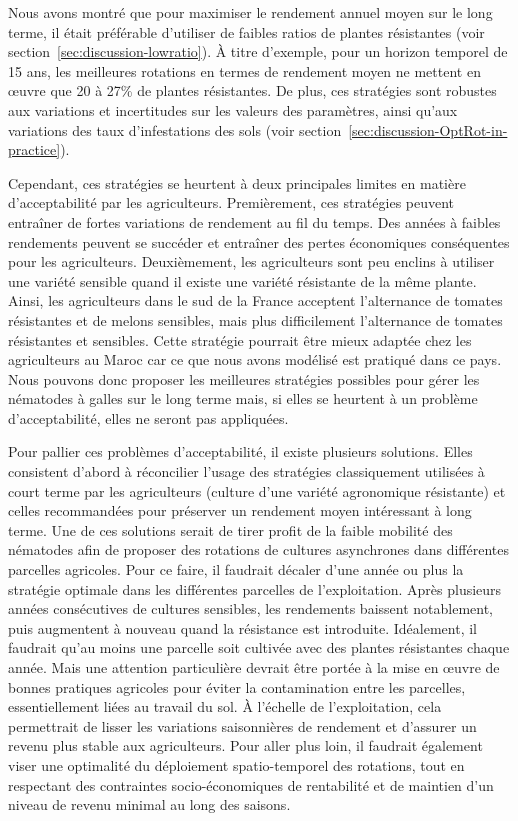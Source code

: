 	Nous avons montré que pour maximiser le rendement annuel moyen sur le long terme,  il était préférable d'utiliser de faibles ratios de plantes résistantes  (voir section~\ref{sec:discussion-lowratio}). À titre d'exemple, pour un horizon temporel de 15 ans, les meilleures rotations en termes de rendement moyen ne mettent en œuvre que 20 à 27\% de plantes résistantes. De plus, ces stratégies sont robustes aux variations et incertitudes sur les valeurs des paramètres, ainsi qu'aux variations des  taux d'infestations des sols (voir section~\ref{sec:discussion-OptRot-in-practice}).
	
	Cependant,  ces stratégies se heurtent à deux principales limites en matière d'acceptabilité par les agriculteurs.  Premièrement, ces stratégies  peuvent  entraîner de fortes variations de rendement au fil du temps. Des années à faibles rendements peuvent se succéder et entraîner des pertes économiques conséquentes pour les agriculteurs. Deuxièmement, les agriculteurs sont peu enclins à utiliser une variété sensible quand il existe une variété résistante de la même plante. Ainsi, les agriculteurs dans le sud de la France acceptent l'alternance de tomates résistantes et de melons sensibles, mais plus difficilement l'alternance de tomates résistantes et sensibles. Cette stratégie pourrait être mieux adaptée chez les agriculteurs au Maroc car ce que nous avons modélisé est pratiqué dans ce pays. 
Nous pouvons donc proposer les meilleures stratégies  possibles pour gérer les nématodes à galles sur le long terme mais,  si elles se heurtent à un problème d'acceptabilité, elles ne seront pas appliquées.
	
	Pour pallier ces problèmes d'acceptabilité, il existe plusieurs solutions. Elles consistent d'abord à réconcilier l'usage des stratégies classiquement  utilisées à court terme par les agriculteurs (culture d'une variété agronomique résistante) et celles recommandées pour préserver un rendement moyen intéressant à long terme. Une de ces solutions serait  de tirer profit de la faible mobilité des nématodes afin de proposer des rotations de cultures  asynchrones dans différentes parcelles agricoles. Pour ce faire, il faudrait décaler d'une année ou plus la stratégie optimale dans les différentes parcelles de l'exploitation. Après plusieurs années consécutives de cultures sensibles, les rendements baissent notablement, puis augmentent à nouveau quand la résistance est introduite. Idéalement, il faudrait qu'au moins une parcelle soit cultivée avec des plantes résistantes chaque année. Mais une attention particulière devrait être portée à la mise en œuvre  de bonnes pratiques agricoles  pour éviter la contamination entre les parcelles, essentiellement liées au travail du sol. À l'échelle de l'exploitation, cela permettrait de lisser les variations saisonnières de rendement et d'assurer un revenu plus stable aux agriculteurs.  Pour aller plus loin,  il faudrait également viser  une optimalité  du déploiement spatio-temporel des rotations, tout en respectant des contraintes socio-économiques de rentabilité et de maintien d’un niveau de revenu
minimal au long des saisons. 
	
